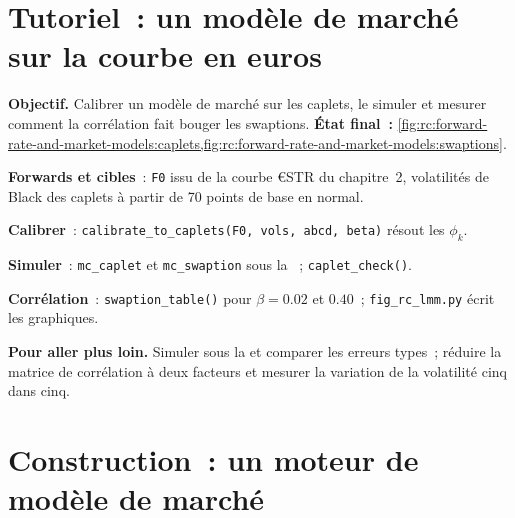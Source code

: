 \section{Tutoriel~: un modèle de marché sur la courbe en euros}\label{tut:rc:forward-rate-and-market-models:tutorial}

\begin{tutorial}
\textbf{Objectif.} Calibrer un modèle de marché sur les caplets, le simuler et mesurer comment la
corrélation fait bouger les swaptions. \textbf{État final~:}
\cref{fig:rc:forward-rate-and-market-models:caplets,fig:rc:forward-rate-and-market-models:swaptions}.
\begin{tutsteps}
\item \textbf{Forwards et cibles}~: \texttt{F0} issu de la courbe €STR du chapitre~2, volatilités de Black
des caplets à partir de 70 points de base en normal.
\item \textbf{Calibrer}~: \texttt{calibrate\_to\_caplets(F0, vols, abcd, beta)}
résout les $\phi_k$.
\item \textbf{Simuler}~: \texttt{mc\_caplet} et \texttt{mc\_swaption} sous la ~; \texttt{caplet\_check()}.
\item \textbf{Corrélation}~: \texttt{swaption\_table()} pour $\beta=0.02$ et $0.40$~;
\texttt{fig\_rc\_lmm.py} écrit les graphiques.
\end{tutsteps}
\textbf{Pour aller plus loin.} Simuler sous la  et comparer les erreurs
types~; réduire la matrice de corrélation à deux facteurs et mesurer la variation de la
volatilité cinq dans cinq.
\end{tutorial}

\section{Construction~: un moteur de modèle de marché}\label{bld:rc:forward-rate-and-market-models:lmm}

